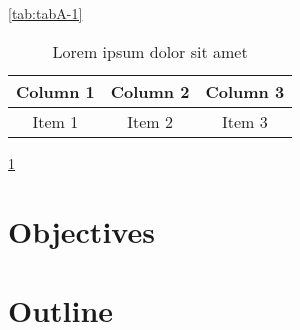 \lipsum[1-1] \ref{tab:tabA-1}

\begin{table}[ht!]
    \centering
    \begin{tabular}{c c c}
        \hline
        Column 1 & Column 2 & Column 3 \\
        \hline
        Item 1   & Item 2   & Item 3   \\
    \end{tabular}
    \caption{Lorem ipsum dolor sit amet}
    \label{tab:tabB-1}
\end{table}

\lipsum[1-1] \ref{tab:tabB-1}

\section{Objectives}

\lipsum[1-2]

\section{Outline}

\lipsum[1-2]
